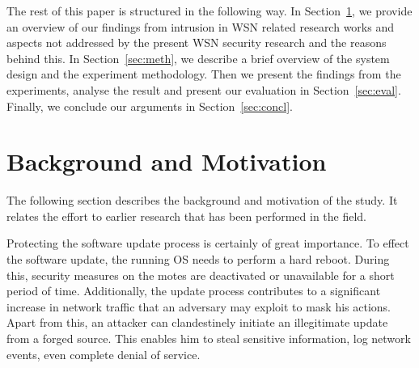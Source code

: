 \documentclass[conference]{IEEEtran}
\begin{document}
The rest of this paper is structured in the following way. 
In Section~\ref{sec:lit}, we provide an overview of our findings from intrusion in WSN related research works and aspects not addressed by the present WSN security research and the reasons behind this. 
In Section~\ref{sec:meth}, we describe a brief overview of the system  design and the experiment methodology. 
Then we  present the findings from the experiments, analyse the result and present our evaluation in Section~\ref{sec:eval}.  
Finally, we conclude our arguments in Section~\ref{sec:concl}.

\section{Background and Motivation}
\label{sec:lit}

The following section describes the background and motivation of the study.  It relates the effort to earlier research that has been performed in the field.



Protecting the software update process is certainly of great importance.
To effect the software update, the running OS needs to perform a hard reboot.%
During this, security  measures on the motes are deactivated or unavailable for a short period of time.
Additionally, the update process contributes to a significant increase in network traffic that an adversary may exploit to  mask his actions. 
Apart from this, an attacker can clandestinely initiate an illegitimate update from a forged source.%
This enables him to steal sensitive information, log network events, even complete denial of service. 
\end{document}
